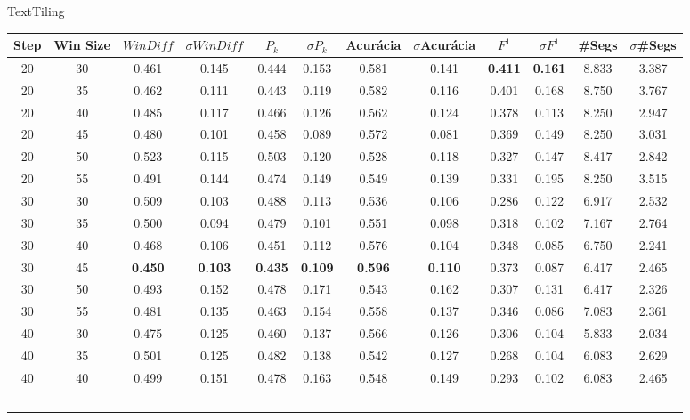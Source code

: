
\tiny
\center TextTiling
\begin{longtable}[c]{|c|c|c|c|c|c|c|c|c|c|c|c|} 
\hline 
 Step & Win Size & $WinDiff$ & $\sigma$$WinDiff$ & $P_k$ & $\sigma$$P_k$ & Acurácia & $\sigma$Acurácia & $F^1$ & $\sigma$$F^1$ & \#Segs & $\sigma$\#Segs\\ \hline 
 20 & 30 & 0.461 & 0.145 & 0.444 & 0.153 & 0.581 & 0.141 & \cellcolor{gray!20} \textbf{0.411} & \cellcolor{gray!20} \textbf{0.161} & 8.833 & 3.387  \\ \hline 
  20 & 35 & 0.462 & 0.111 & 0.443 & 0.119 & 0.582 & 0.116 & 0.401 & 0.168 & 8.750 & 3.767  \\ \hline 
  20 & 40 & 0.485 & 0.117 & 0.466 & 0.126 & 0.562 & 0.124 & 0.378 & 0.113 & 8.250 & 2.947  \\ \hline 
  20 & 45 & 0.480 & 0.101 & 0.458 & 0.089 & 0.572 & 0.081 & 0.369 & 0.149 & 8.250 & 3.031  \\ \hline 
  20 & 50 & 0.523 & 0.115 & 0.503 & 0.120 & 0.528 & 0.118 & 0.327 & 0.147 & 8.417 & 2.842  \\ \hline 
  20 & 55 & 0.491 & 0.144 & 0.474 & 0.149 & 0.549 & 0.139 & 0.331 & 0.195 & 8.250 & 3.515  \\ \hline 
  30 & 30 & 0.509 & 0.103 & 0.488 & 0.113 & 0.536 & 0.106 & 0.286 & 0.122 & 6.917 & 2.532  \\ \hline 
  30 & 35 & 0.500 & 0.094 & 0.479 & 0.101 & 0.551 & 0.098 & 0.318 & 0.102 & 7.167 & 2.764  \\ \hline 
  30 & 40 & 0.468 & 0.106 & 0.451 & 0.112 & 0.576 & 0.104 & 0.348 & 0.085 & 6.750 & 2.241  \\ \hline 
  30 & 45 & \cellcolor{gray!20} \textbf{0.450} & \cellcolor{gray!20} \textbf{0.103} & \cellcolor{gray!20} \textbf{0.435} & \cellcolor{gray!20} \textbf{0.109} & \cellcolor{gray!20} \textbf{0.596} & \cellcolor{gray!20} \textbf{0.110} & 0.373 & 0.087 & 6.417 & 2.465  \\ \hline 
  30 & 50 & 0.493 & 0.152 & 0.478 & 0.171 & 0.543 & 0.162 & 0.307 & 0.131 & 6.417 & 2.326  \\ \hline 
  30 & 55 & 0.481 & 0.135 & 0.463 & 0.154 & 0.558 & 0.137 & 0.346 & 0.086 & 7.083 & 2.361  \\ \hline 
  40 & 30 & 0.475 & 0.125 & 0.460 & 0.137 & 0.566 & 0.126 & 0.306 & 0.104 & 5.833 & 2.034  \\ \hline 
  40 & 35 & 0.501 & 0.125 & 0.482 & 0.138 & 0.542 & 0.127 & 0.268 & 0.104 & 6.083 & 2.629  \\ \hline 
  40 & 40 & 0.499 & 0.151 & 0.478 & 0.163 & 0.548 & 0.149 & 0.293 & 0.102 & 6.083 & 2.465  \\ \hline 
$$
\end{longtable}
